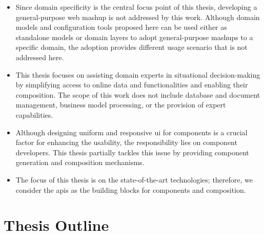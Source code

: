 \begin{itemize}
\tightlist
\item
  Since domain specificity is the central focus point of this thesis,
  developing a general-purpose web mashup is not addressed by this work.
  Although domain models and configuration tools proposed here can be
  used either as standalone models or domain layers to adopt
  general-purpose mashups to a specific domain, the adoption provides
  different usage scenario that is not addressed here.
\item
  This thesis focuses on assisting domain experts in situational
  decision-making by simplifying access to online data and
  functionalities and enabling their composition. The scope of this work
  does not include database and document management, business model
  processing, or the provision of expert capabilities.
\item
  Although designing uniform and responsive \gls{ui} for
  components is a crucial factor for enhancing the usability, the
  responsibility lies on component developers. This thesis partially
  tackles this issue by providing component generation and composition
  mechanisms.
\item
  The focus of this thesis is on the state-of-the-art technologies;
  therefore, we consider the \gls{api}s as the building blocks for components
  and composition.
\end{itemize}


\vspace{-10pt}
\hypertarget{structure-of-this-thesis}{%
\section{Thesis Outline}\label{structure-of-this-thesis}}
\vspace{15pt}

